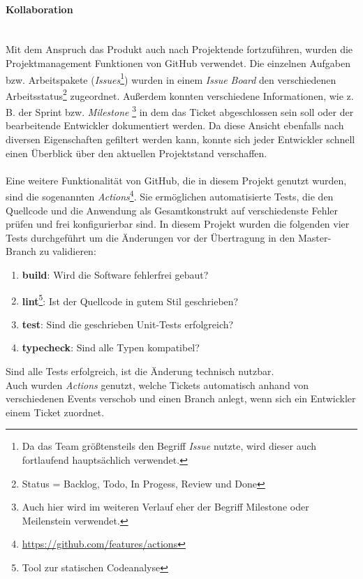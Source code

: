 \documentclass[10pt, a4paper]{article}
\begin{document}
\begin{onehalfspace}
      \paragraph{Kollaboration} $~$ \\
      Mit dem Anspruch das Produkt auch nach Projektende fortzuführen, wurden die Projektmanagement Funktionen von GitHub verwendet. Die einzelnen Aufgaben bzw. Arbeitspakete (\textit{Issues}\footnote{Da das Team größtensteils den Begriff \textit{Issue} nutzte, wird dieser auch fortlaufend hauptsächlich verwendet.}) wurden in einem \textit{Issue Board} den verschiedenen Arbeitsstatus\footnote{Status = Backlog, Todo, In Progess, Review und Done}
      zugeordnet. Außerdem konnten verschiedene Informationen, wie z. B. der Sprint bzw. \textit{Milestone} \footnote{Auch hier wird im weiteren Verlauf eher der Begriff Milestone oder Meilenstein verwendet.} in dem das Ticket abgeschlossen sein soll oder der bearbeitende Entwickler dokumentiert werden.
      Da diese Ansicht ebenfalls nach diversen Eigenschaften gefiltert werden kann, konnte sich jeder Entwickler schnell einen Überblick über den aktuellen Projektstand verschaffen.
      \\~\\
      Eine weitere Funktionalität von GitHub, die in diesem Projekt genutzt wurden, sind die sogenannten \textit{Actions}\footnote{\raggedright\url{https://github.com/features/actions}}.
      Sie ermöglichen automatisierte Tests, die den Quellcode und die Anwendung als Gesamtkonstrukt auf verschiedenste Fehler prüfen und frei konfigurierbar sind.\newpage
      In diesem Projekt wurden die folgenden vier Tests durchgeführt um die Änderungen vor der Übertragung in den Master-Branch zu validieren:
      \begin{enumerate}
        \item \textbf{build}: Wird die Software fehlerfrei gebaut?
        \item \textbf{lint}\footnote{Tool zur statischen Codeanalyse}: Ist der Quellcode in gutem Stil geschrieben?
        \item \textbf{test}: Sind die geschrieben Unit-Tests erfolgreich?
        \item \textbf{typecheck}: Sind alle Typen kompatibel?
      \end{enumerate}
      Sind alle Tests erfolgreich, ist die Änderung technisch nutzbar. \\
      Auch wurden \textit{Actions} genutzt, welche Tickets automatisch anhand von verschiedenen Events verschob und einen Branch anlegt, wenn sich ein Entwickler einem Ticket zuordnet.

\end{onehalfspace}
\end{document}
